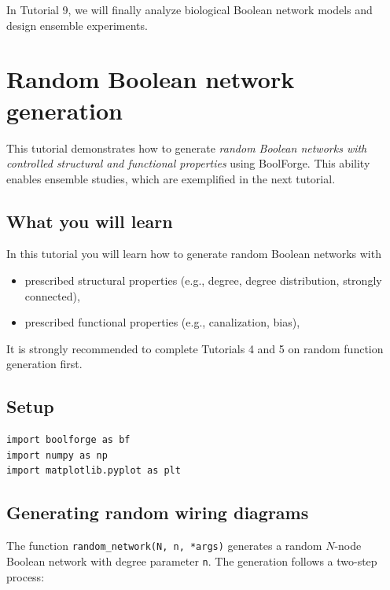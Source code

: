 \documentclass[
]{article}
\providecommand{\tightlist}{%
  \setlength{\itemsep}{0pt}\setlength{\parskip}{0pt}}
\begin{document}
In Tutorial 9, we will finally analyze biological Boolean network models
and design ensemble experiments.

\section{Random Boolean network
generation}\label{random-boolean-network-generation}

This tutorial demonstrates how to generate \emph{random Boolean networks
with controlled structural and functional properties} using BoolForge.
This ability enables ensemble studies, which are exemplified in the next
tutorial.

\subsection{What you will learn}\label{what-you-will-learn-8}

In this tutorial you will learn how to generate random Boolean networks
with

\begin{itemize}
\tightlist
\item
  prescribed structural properties (e.g., degree, degree distribution,
  strongly connected),
\item
  prescribed functional properties (e.g., canalization, bias),
\end{itemize}

It is strongly recommended to complete Tutorials 4 and 5 on random
function generation first.

\subsection{Setup}\label{setup-8}

\begin{lstlisting}
import boolforge as bf
import numpy as np
import matplotlib.pyplot as plt
\end{lstlisting}

\subsection{Generating random wiring
diagrams}\label{generating-random-wiring-diagrams}

The function \texttt{random\_network(N,\ n,\ *args)} generates a random
\(N\)-node Boolean network with degree parameter \texttt{n}. The
generation follows a two-step process:
\end{document}
